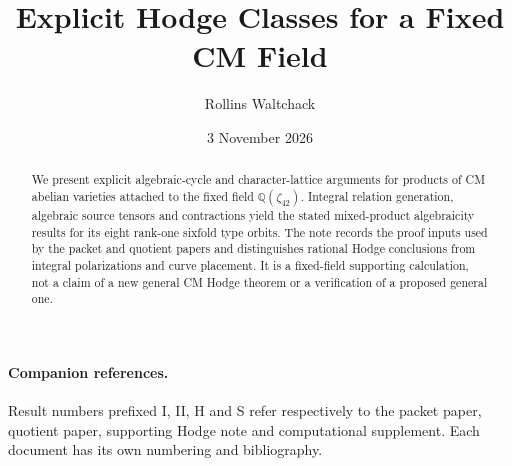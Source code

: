 \documentclass[11pt]{article}
\title{Explicit Hodge Classes for a Fixed CM Field}
\author{Rollins Waltchack}
\date{3 November 2026}
\begin{document}
\maketitle
\begin{abstract}
We present explicit algebraic-cycle and character-lattice arguments
for products of CM abelian varieties attached to the fixed field
$\mathbb Q(\zeta_{42})$. Integral relation generation, algebraic source
tensors and contractions yield the stated mixed-product algebraicity
results for its eight rank-one sixfold type orbits. The note records the
proof inputs used by the packet and quotient papers and distinguishes
rational Hodge conclusions from integral polarizations and curve
placement. It is a fixed-field supporting calculation, not a claim of a
new general CM Hodge theorem or a verification of a proposed general one.
\end{abstract}
\paragraph{Companion references.}
Result numbers prefixed I, II, H and S refer respectively to the packet
paper, quotient paper, supporting Hodge note and computational supplement.
Each document has its own numbering and bibliography.
{\small\tableofcontents}
\clearpage



\begingroup\small

\endgroup
\end{document}
